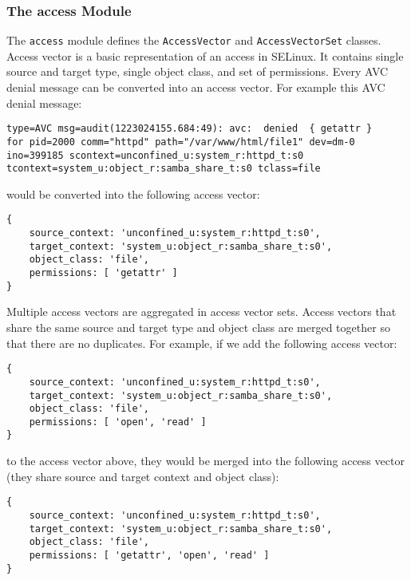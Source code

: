 \subsubsection{The access Module}

The \texttt{access} module defines the \texttt{AccessVector} and
\texttt{AccessVectorSet} classes. Access vector is a basic representation of an
access in SELinux. It contains single source and target type, single object
class, and set of permissions. Every AVC denial message can be converted into an
access vector. For example this AVC denial message:
\begin{lstlisting}
type=AVC msg=audit(1223024155.684:49): avc:  denied  { getattr }
for pid=2000 comm="httpd" path="/var/www/html/file1" dev=dm-0
ino=399185 scontext=unconfined_u:system_r:httpd_t:s0
tcontext=system_u:object_r:samba_share_t:s0 tclass=file
\end{lstlisting}
would be converted into the following access vector:
\begin{lstlisting}
{
    source_context: 'unconfined_u:system_r:httpd_t:s0',
    target_context: 'system_u:object_r:samba_share_t:s0',
    object_class: 'file',
    permissions: [ 'getattr' ]
}
\end{lstlisting}

Multiple access vectors are aggregated in access vector sets. Access vectors
that share the same source and target type and object class are merged together
so that there are no duplicates. For example, if we add the following access
vector:
\begin{lstlisting}
{
    source_context: 'unconfined_u:system_r:httpd_t:s0',
    target_context: 'system_u:object_r:samba_share_t:s0',
    object_class: 'file',
    permissions: [ 'open', 'read' ]
}
\end{lstlisting}
to the access vector above, they would be merged into the following access
vector (they share source and target context and object class):
\begin{lstlisting}
{
    source_context: 'unconfined_u:system_r:httpd_t:s0',
    target_context: 'system_u:object_r:samba_share_t:s0',
    object_class: 'file',
    permissions: [ 'getattr', 'open', 'read' ]
}
\end{lstlisting}

